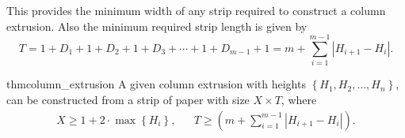 This provides the minimum width of any strip required to construct a column extrusion.
Also the minimum required strip length is given by
$$ T = 1 + D_1  +  1 + D_2  +  1 + D_3  +\cdots +  1 + D_{m-1}  +  1 = m + \sum^{m-1}_{i=1} \left| H_{i+1}-H_i\right|. $$

\begin{restatable}{thm}{column_extrusion}
\label{thm:column_extrusion}
A given column extrusion with heights $\left\{ H_1, H_2,\dots, H_n \right\}$, can be constructed from a strip of paper with size
$X\times T$, where
\begin{align*}
X\ge 1 + 2\cdot\max\left\{ H_i\right\}, && T \ge \left( m + \sum\limits^{m-1}_{i=1} \left| H_{i+1}-H_i\right|\right).
\end{align*}
\end{restatable}
